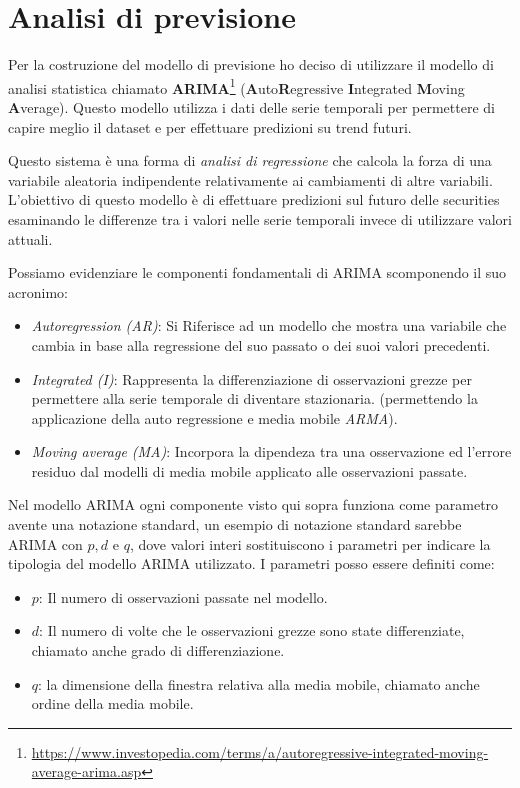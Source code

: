
\section{Analisi di previsione}

Per la costruzione del modello di previsione ho deciso di utilizzare il modello di analisi statistica chiamato
\textbf{ARIMA}\footnote{
    \href{https://www.investopedia.com/terms/a/autoregressive-integrated-moving-average-arima.asp}{https://www.investopedia.com/terms/a/autoregressive-integrated-moving-average-arima.asp}
} (\textbf{A}uto\textbf{R}egressive \textbf{I}ntegrated \textbf{M}oving \textbf{A}verage).
Questo modello utilizza i dati delle serie temporali per permettere di capire meglio il dataset e per effettuare predizioni su trend futuri.

Questo sistema è una forma di \emph{analisi di regressione} che calcola la forza di una variabile aleatoria indipendente relativamente ai cambiamenti di altre variabili.
L'obiettivo di questo modello è di effettuare predizioni sul futuro delle securities esaminando le differenze tra i valori nelle serie temporali invece di utilizzare valori attuali.  

Possiamo evidenziare le componenti fondamentali di ARIMA scomponendo il suo acronimo:
\begin{itemize}
    \item \emph{Autoregression (AR)}: Si Riferisce ad un modello che mostra una variabile che cambia in base alla regressione
    del suo passato o dei suoi valori precedenti.
    \item \emph{Integrated (I)}: Rappresenta la differenziazione di osservazioni grezze per permettere alla serie temporale di diventare
    stazionaria. (permettendo la applicazione della auto regressione e media mobile \emph{ARMA}).
    \item \emph{Moving average (MA)}: Incorpora la dipendeza tra una osservazione ed l'errore residuo dal modelli di media 
    mobile applicato alle osservazioni passate.
\end{itemize}

Nel modello ARIMA ogni componente visto qui sopra funziona come parametro avente una notazione standard, 
un esempio di notazione standard sarebbe ARIMA con \(p, d\) e \(q\), dove valori interi sostituiscono i parametri
per indicare la tipologia del modello ARIMA utilizzato. I parametri posso essere definiti come:

\begin{itemize}
    \item \(p\): Il numero di osservazioni passate nel modello.
    \item \(d\): Il numero di volte che le osservazioni grezze sono state differenziate, chiamato anche grado di differenziazione.
    \item \(q\): la dimensione della finestra relativa alla media mobile, chiamato anche ordine della media mobile.
\end{itemize}

